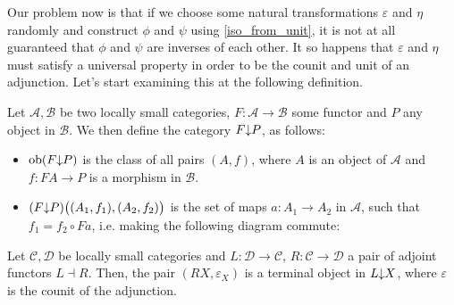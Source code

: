 Our problem now is that if we choose some natural transformations $\varepsilon$ and $\eta$ randomly and construct $\phi$ and $\psi$ using \eqref{iso_from_unit}, it is not at all guaranteed that $\phi$ and $\psi$ are inverses of each other. It so happens that $\varepsilon$ and $\eta$ must satisfy a universal property in order to be the counit and unit of an adjunction. Let's start examining this at the following definition.
\begin{definition}[2.3.4] Let $\mathcal{A},\mathcal{B}$ be two locally small categories, $F:\mathcal{A}\to\mathcal{B}$ some functor and $P$ any object in $\mathcal{B}$. We then define the category $F\mkern-5mu\downarrow\mkern-5mu P$, as follows:
\begin{itemize}
\item $\mathrm{ob}(F\mkern-5mu\downarrow\mkern-5mu P)$ is the class of all pairs $(A,f)$, where $A$ is an object of $\mathcal{A}$ and $f:FA\to P$ is a morphism in $\mathcal{B}$.
\item $(F\mkern-5mu\downarrow\mkern-5mu P)\big((A_1,f_1),(A_2,f_2)\big)$ is the set of maps $a:A_1\to A_2$ in $\mathcal{A}$, such that $f_1=f_2\circ Fa$, i.e. making the following diagram commute:
\begin{center}
\end{center}
\end{itemize}
\end{definition}
\begin{proposition}[co-2.3.5] Let $\mathcal{C},\mathcal{D}$ be locally small categories and $L:\mathcal{D}\to\mathcal{C}$, $R:\mathcal{C}\to\mathcal{D}$ a pair of adjoint functors $L\dashv R$. Then, the pair $(RX, \varepsilon_X)$ is a terminal object in $L\mkern-5mu\downarrow\mkern-5mu X$, where $\varepsilon$ is the counit of the adjunction.
\end{proposition}
